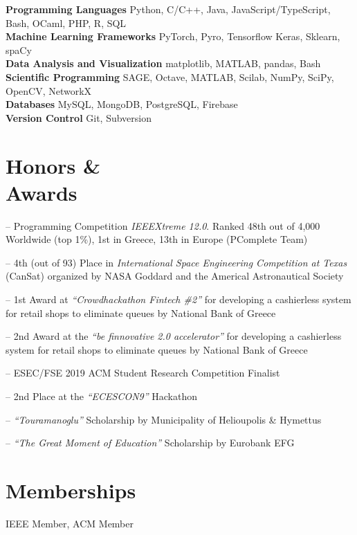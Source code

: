 \documentclass[margin, 10pt]{res}
\newcommand{\field}[2]{\noindent \textbf{#1} \hfill #2 \\}
\begin{document}
\begin{resume}
\field{Programming Languages}  {Python, C/C++, Java, JavaScript/TypeScript, Bash, OCaml, PHP, R, SQL  } 
\field{Machine Learning Frameworks}  {PyTorch, Pyro, Tensorflow Keras, Sklearn, spaCy } 
\field{Data Analysis and Visualization} {matplotlib, MATLAB, pandas, Bash } 
\field{Scientific Programming} {SAGE, Octave, MATLAB, Scilab, NumPy, SciPy, OpenCV, NetworkX} 
\field{Databases} {MySQL, MongoDB, PostgreSQL, Firebase}
\field{Version Control} {Git, Subversion}
\section{Honors \& \\ Awards} 
\begin{compactitem}
    \item[--] Programming Competition \emph{IEEEXtreme 12.0}. Ranked 48th out of 4,000 Worldwide (top 1\%), 1st in Greece, 13th in Europe (PComplete Team)
    \item[--] 4th (out of 93) Place in \emph{International Space Engineering  Competition at Texas} (CanSat) organized by NASA Goddard and the Americal Astronautical Society
    \item[--] 1st Award at \emph{``Crowdhackathon Fintech \#2''} for developing a cashierless system for retail shops to eliminate queues by National Bank of Greece
    \item[--] 2nd Award at the \emph{``be finnovative 2.0 accelerator''} for developing a cashierless system for retail shops to eliminate queues by National Bank of Greece
    \item[--] ESEC/FSE 2019 ACM Student Research Competition Finalist
    \item[--] 2nd Place at the \emph{``ECESCON9''} Hackathon 
    \item [--] \emph{``Touramanoglu''} Scholarship by Municipality of Helioupolis \& Hymettus
    \item [--] \emph{``The Great Moment of Education''} Scholarship by Eurobank EFG 

\end{compactitem}


\section{Memberships} IEEE Member, ACM Member


\end{resume}
\end{document}
